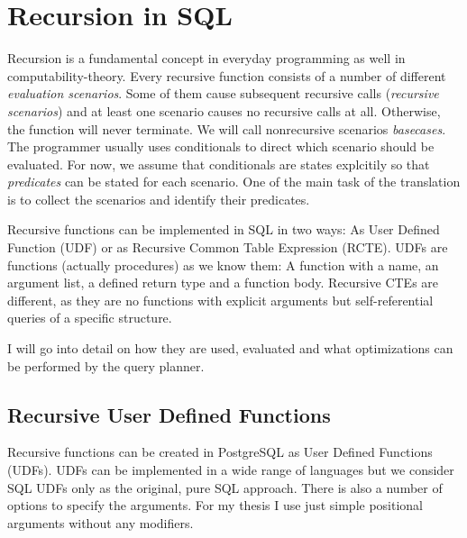 

\section{Recursion in SQL}

Recursion is a fundamental concept in everyday programming as well in computability-theory. Every recursive function consists of a number of different \textit{evaluation scenarios}. Some of them cause subsequent recursive calls (\textit{recursive scenarios}) and at least one scenario causes no recursive calls at all. Otherwise, the function will never terminate. We will call nonrecursive scenarios \textit{basecases}. The programmer usually uses conditionals to direct which scenario should be evaluated. For now, we assume that conditionals are states explcitily so that \textit{predicates} can be stated for each scenario. One of the main task of the translation is to collect the scenarios and identify their predicates.

Recursive functions can be implemented in SQL in two ways: As User Defined Function (UDF) or as Recursive Common Table Expression (RCTE). UDFs are functions (actually procedures) as we know them: A function with a name, an argument list, a defined return type and a function body. Recursive CTEs are different, as they are no functions with explicit arguments but self-referential queries of a specific structure.

I will go into detail on how they are used, evaluated and what optimizations can be performed by the query planner.

\subsection{Recursive User Defined Functions}
Recursive functions can be created in PostgreSQL as User Defined Functions (UDFs). UDFs can be implemented in a wide range of languages but we consider SQL UDFs only as the original, pure SQL approach. There is also a number of options to specify the arguments. For my thesis I use just simple positional arguments without any modifiers.

